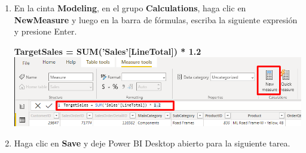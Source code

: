 \documentclass[12pt,letterpaper]{article}
\newcommand\tab[1][1cm]{\hspace*{#1}}
\begin{document}
\begin{enumerate}[\tab 1.]
\begin{center}
        \end{center}
        \item En la cinta \textbf{Modeling}, en el grupo \textbf{Calculations}, haga clic en \textbf{NewMeasure} y luego en la barra de fórmulas, escriba la siguiente expresión y presione Enter.
        \begin{center}
            \textbf{TargetSales = SUM('Sales'[LineTotal]) * 1.2}
            \includegraphics[width=13cm]{./img/img46.png}
        \end{center}
        \item Haga clic en \textbf{Save} y deje Power BI Desktop abierto para la siguiente tarea.
    \end{enumerate}
\end{document}
